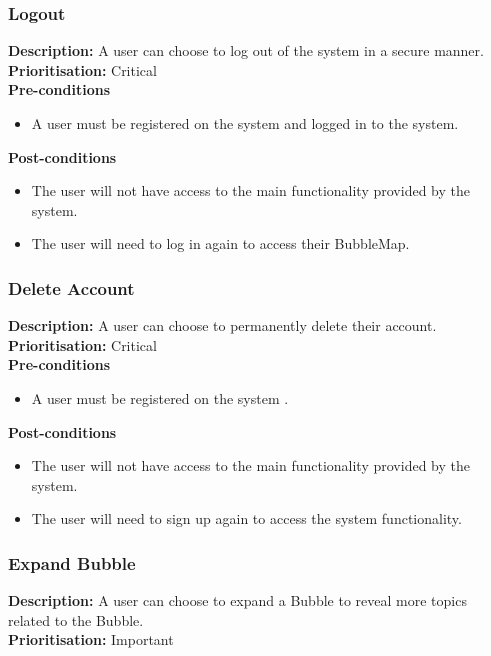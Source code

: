\documentclass[hidelinks,english]{article}
\begin{document}
    \subsubsection{Logout}
	\textbf{Description:}  A user can choose to log out of the system in a secure manner.
	\\
    \textbf{Prioritisation:} Critical\\
    
    
      \textbf{Pre-conditions}
    \begin{itemize}
        \item A user must be registered on the system and logged in to the system.
    \end{itemize}
    
    \textbf{Post-conditions}
     \begin{itemize}
        \item The user will not have access to the main functionality provided by the system.
        \item The user will need to log in again to access their BubbleMap.
    \end{itemize}
    
    \subsubsection{Delete Account}
	\textbf{Description:}  A user can choose to permanently delete their account.
	\\
    \textbf{Prioritisation:} Critical\\
    
    
      \textbf{Pre-conditions}
    \begin{itemize}
        \item A user must be registered on the system .
    \end{itemize}
    
    \textbf{Post-conditions}
     \begin{itemize}
        \item The user will not have access to the main functionality provided by the system.
        \item The user will need to sign up again to access the system functionality.
    \end{itemize}
    
    \subsubsection{Expand Bubble}
	\textbf{Description:}  A user can choose to expand a Bubble to reveal more topics related to the Bubble.
	\\
    \textbf{Prioritisation:} Important\\
    
\end{document}
